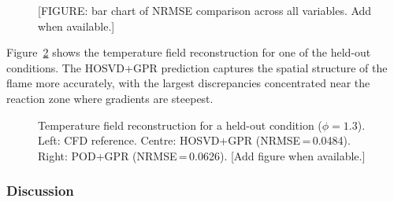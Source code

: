 \FloatBarrier
\begin{figure}[htbp]
    \centering
    \caption{[FIGURE: bar chart of NRMSE comparison across all variables. Add when available.]}
    \label{fig:ulb_nrmse}
\end{figure}
\FloatBarrier

Figure~\ref{fig:ulb_temp_reconstruction} shows the temperature field reconstruction for one of the held-out conditions. The HOSVD+GPR prediction captures the spatial structure of the flame more accurately, with the largest discrepancies concentrated near the reaction zone where gradients are steepest.

\FloatBarrier
\begin{figure}[htbp]
    \centering
    \caption{Temperature field reconstruction for a held-out condition ($\phi = 1.3$). Left: CFD reference. Centre: HOSVD+GPR (NRMSE\,=\,0.0484). Right: POD+GPR (NRMSE\,=\,0.0626). [Add figure when available.]}
    \label{fig:ulb_temp_reconstruction}
\end{figure}
\FloatBarrier

\subsubsection*{Discussion}

